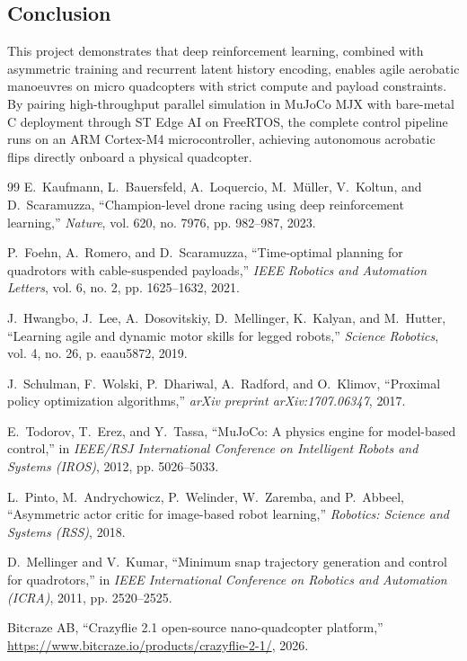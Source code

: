 \documentclass[11pt,a4paper]{article}
\begin{document}
\subsection{Conclusion}
This project demonstrates that deep reinforcement learning, combined with asymmetric training and recurrent latent history encoding, enables agile aerobatic manoeuvres on micro quadcopters with strict compute and payload constraints. By pairing high-throughput parallel simulation in MuJoCo MJX with bare-metal C deployment through ST Edge AI on FreeRTOS, the complete control pipeline runs on an ARM Cortex-M4 microcontroller, achieving autonomous acrobatic flips directly onboard a physical quadcopter.

\begin{thebibliography}{99}
\footnotesize
\setlength{\itemsep}{0pt}
\setlength{\parskip}{0pt}
E.~Kaufmann, L.~Bauersfeld, A.~Loquercio, M.~M{\"u}ller, V.~Koltun, and D.~Scaramuzza, ``Champion-level drone racing using deep reinforcement learning,'' \emph{Nature}, vol. 620, no. 7976, pp. 982--987, 2023.

P.~Foehn, A.~Romero, and D.~Scaramuzza, ``Time-optimal planning for quadrotors with cable-suspended payloads,'' \emph{IEEE Robotics and Automation Letters}, vol. 6, no. 2, pp. 1625--1632, 2021.

J.~Hwangbo, J.~Lee, A.~Dosovitskiy, D.~Mellinger, K.~Kalyan, and M.~Hutter, ``Learning agile and dynamic motor skills for legged robots,'' \emph{Science Robotics}, vol. 4, no. 26, p. eaau5872, 2019.

J.~Schulman, F.~Wolski, P.~Dhariwal, A.~Radford, and O.~Klimov, ``Proximal policy optimization algorithms,'' \emph{arXiv preprint arXiv:1707.06347}, 2017.

E.~Todorov, T.~Erez, and Y.~Tassa, ``MuJoCo: A physics engine for model-based control,'' in \emph{IEEE/RSJ International Conference on Intelligent Robots and Systems (IROS)}, 2012, pp. 5026--5033.

L.~Pinto, M.~Andrychowicz, P.~Welinder, W.~Zaremba, and P.~Abbeel, ``Asymmetric actor critic for image-based robot learning,'' \emph{Robotics: Science and Systems (RSS)}, 2018.

D.~Mellinger and V.~Kumar, ``Minimum snap trajectory generation and control for quadrotors,'' in \emph{IEEE International Conference on Robotics and Automation (ICRA)}, 2011, pp. 2520--2525.

Bitcraze AB, ``Crazyflie 2.1 open-source nano-quadcopter platform,'' \url{https://www.bitcraze.io/products/crazyflie-2-1/}, 2026.
\end{thebibliography}
\end{document}
